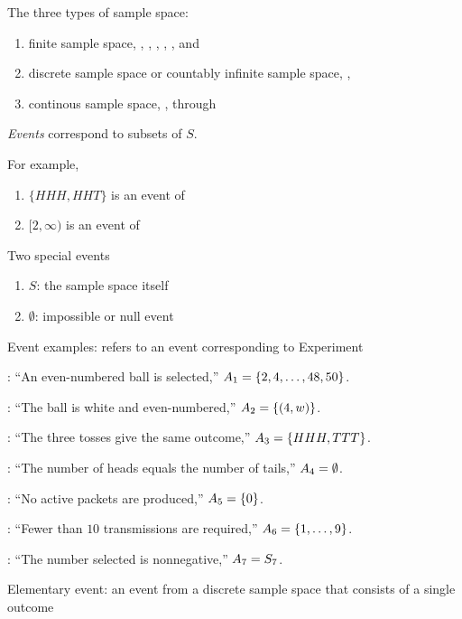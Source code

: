 	\item The three types of sample space:
	\begin{enumerate}
		\item finite sample space, \eg,
			, , , , and 
		\item discrete sample space or countably infinite sample space, \eg, 
		\item continous sample space, \eg,  through 
	\end{enumerate}

	\item \emph{Events} correspond to subsets of $S$.
	\bit
		\item For example,
			\begin{enumerate}
				\item $\{HHH,HHT\}$ is an event of 
				\item $[2,\infty)$ is an event of 
			\end{enumerate}
		\item Two special events
			\begin{enumerate}
				\item $S$: the sample space itself
				\item $\emptyset$: impossible or null event
			\end{enumerate}
	\eit

	\item Event examples:  refers to an event corresponding to Experiment 
	\bit
		\item {}: ``An even-numbered ball is selected,'' $A_{1} = \{2, 4, \ldots, 48, 50\}$.
		\item {}: ``The ball is white and even-numbered,'' $A_{2} = \{(4, w)\}$.
		\item {}: ``The three tosses give the same outcome,'' $A_{3} = \{HHH, TTT\}$.
		\item {}: ``The number of heads equals the number of tails,'' $A_{4} = \emptyset$.
		\item {}: ``No active packets are produced,'' $A_{5} = \{0\}$.
		\item {}: ``Fewer than $10$ transmissions are required,'' $A_{6} = \{1, \ldots, 9\}$.
		\item {}: ``The number selected is nonnegative,'' $A_{7} = S_7$.
	\eit

	\item Elementary event: an event from a discrete sample space that consists of a single outcome


